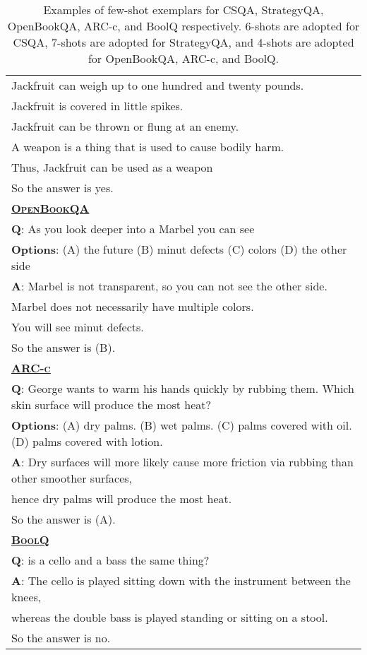 \begin{table}[htbp]
\begin{tabular}{p{}}
        Jackfruit can weigh up to one hundred and twenty pounds. \\
        Jackfruit is covered in little spikes. \\
        Jackfruit can be thrown or flung at an enemy. \\
        A weapon is a thing that is used to cause bodily harm. \\
        Thus, Jackfruit can be used as a weapon \\
        So the answer is yes. \\
        \midrule
        \underline{\textbf{\textsc{OpenBookQA}}} \\
        \textbf{Q}: As you look deeper into a Marbel you can see \\
        \textbf{Options}: (A) the future (B) minut defects (C) colors (D) the other side \\
        \textbf{A}: Marbel is not transparent, so you can not see the other side. \\ 
        Marbel does not necessarily have multiple colors. \\
        You will see minut defects. \\ 
        So the answer is (B). \\
        \midrule
        \underline{\textbf{\textsc{ARC-c}}} \\
        \textbf{Q}: George wants to warm his hands quickly by rubbing them. Which skin surface will produce the most heat? \\
        \textbf{Options}:  (A) dry palms. (B) wet palms. (C) palms covered with oil. (D) palms covered with lotion. \\
        \textbf{A}: Dry surfaces will more likely cause more friction via rubbing than other smoother surfaces,\\
        hence dry palms will produce the most heat. \\
        So the answer is (A).\\
        \midrule
        \underline{\textbf{\textsc{BoolQ}}} \\
        \textbf{Q}: is a cello and a bass the same thing? \\
        \textbf{A}: The cello is played sitting down with the instrument between the knees, \\ 
        whereas the double bass is played standing or sitting on a stool. \\ So the answer is no.\\
        \bottomrule
    \end{tabular}
    \caption{Examples of few-shot exemplars for CSQA, StrategyQA, OpenBookQA, ARC-c, and BoolQ respectively. 6-shots are adopted for CSQA, 7-shots are adopted for StrategyQA, and 4-shots are adopted for OpenBookQA, ARC-c, and BoolQ. }
    \label{tab:exp-csqa}
\end{table}
